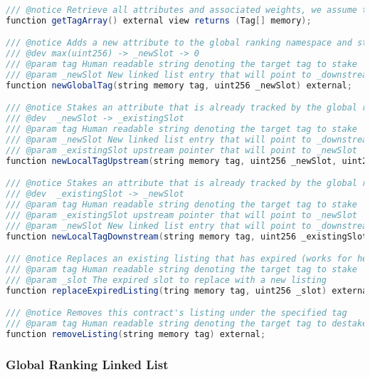 \begin{lstlisting}[language=Java, caption=a minimal interface for a content object]
/// @notice Retrieve all attributes and associated weights, we assume the size of this array is small enough to return without pagination
function getTagArray() external view returns (Tag[] memory);

/// @notice Adds a new attribute to the global ranking namespace and stakes it for this content object
/// @dev max(uint256) -> _newSlot -> 0
/// @param tag Human readable string denoting the target tag to stake
/// @param _newSlot New linked list entry that will point to _downstream slot
function newGlobalTag(string memory tag, uint256 _newSlot) external;

/// @notice Stakes an attribute that is already tracked by the global ranking namespace but hasn't been staked by this content object yet
/// @dev  _newSlot -> _existingSlot
/// @param tag Human readable string denoting the target tag to stake
/// @param _newSlot New linked list entry that will point to _downstream slot
/// @param _existingSlot upstream pointer that will point to _newSlot
function newLocalTagUpstream(string memory tag, uint256 _newSlot, uint256 _existingSlot) external;

/// @notice Stakes an attribute that is already tracked by the global ranking namespace but hasn't been staked by this content object yet
/// @dev  _existingSlot -> _newSlot
/// @param tag Human readable string denoting the target tag to stake
/// @param _existingSlot upstream pointer that will point to _newSlot
/// @param _newSlot New linked list entry that will point to _downstream slot
function newLocalTagDownstream(string memory tag, uint256 _existingSlot, uint256 _newSlot) external;

/// @notice Replaces an existing listing that has expired (works for head and tail listings)
/// @param tag Human readable string denoting the target tag to stake
/// @param _slot The expired slot to replace with a new listing
function replaceExpiredListing(tring memory tag, uint256 _slot) external;

/// @notice Removes this contract's listing under the specified tag
/// @param tag Human readable string denoting the target tag to destake
function removeListing(string memory tag) external;
\end{lstlisting}

\subsubsection{Global Ranking Linked List}
\label{GlobalRankingInterface}

